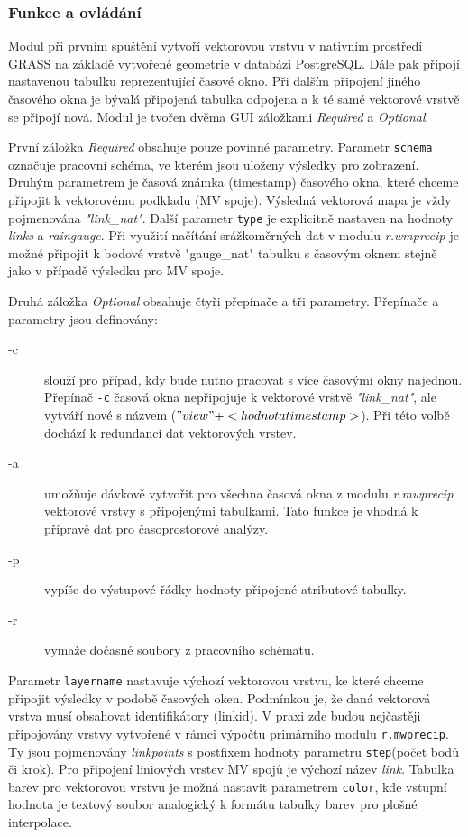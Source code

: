 \documentclass[a4paper,12pt,oneside]{report}
\begin{document}
\subsubsection{Funkce a ovládání}
Modul při prvním spuštění vytvoří vektorovou vrstvu v nativním
prostředí GRASS na základě vytvořené geometrie v databázi
PostgreSQL. Dále pak připojí nastavenou tabulku reprezentující časové
okno. Při dalším připojení jiného časového okna je bývalá připojená
tabulka odpojena a k té samé vektorové vrstvě se připojí nová. Modul
je tvořen dvěma GUI záložkami \textit{Required} a \textit{Optional}.

První záložka \textit{Required} obsahuje pouze povinné parametry.
Parametr \texttt{schema} označuje pracovní schéma, ve kterém jsou
uloženy výsledky pro zobrazení. Druhým parametrem je časová známka
(timestamp) časového okna, které chceme připojit k vektorovému
podkladu (MV spoje). Výsledná vektorová mapa je vždy pojmenována
\textit{"link\_nat"}. Další parametr \texttt{type} je explicitně
nastaven na hodnoty \emph{links} a \emph{raingauge}. Při využití
načítání srážkoměrných dat v modulu \textit{r.wmprecip} je možné
připojit k bodové vrstvě "gauge\_nat" tabulku s časovým oknem stejně
jako v případě výsledku pro MV spoje.

Druhá záložka \textit{Optional} obsahuje čtyři přepínače a tři
parametry.  Přepínače a parametry jsou definovány:
\begin{description}
\item[-c] slouží pro případ, kdy bude nutno pracovat s více časovými
  okny najednou. Přepínač \texttt{-c} časová okna nepřipojuje k
  vektorové vrstvě \textit{"link\_nat"}, ale vytváří nové s názvem
  ($"view" + <hodnota timestamp>$). Při této volbě dochází k
  redundanci dat vektorových vrstev.
\item[-a] umožňuje dávkově vytvořit pro všechna časová okna z modulu
  \textit{r.mwprecip} vektorové vrstvy s připojenými tabulkami. Tato
  funkce je vhodná k přípravě dat pro časoprostorové analýzy.
\item[-p] vypíše do výstupové řádky hodnoty připojené atributové
  tabulky.
\item[-r] vymaže dočasné soubory z pracovního schématu.
\end{description}


Parametr \texttt{layername} nastavuje výchozí vektorovou vrstvu, ke
které chceme připojit výsledky v podobě časových oken. Podmínkou je,
že daná vektorová vrstva musí obsahovat identifikátory (linkid). V
praxi zde budou nejčastěji připojovány vrstvy vytvořené v rámci
výpočtu primárního modulu \texttt{r.mwprecip}. Ty jsou pojmenovány
\textit{linkpoints} s postfixem hodnoty parametru \texttt{step}(počet
bodů či krok). Pro připojení liniových vrstev MV spojů je výchozí
název \textit{link}.  Tabulka barev pro vektorovou vrstvu je možná
nastavit parametrem \texttt{color}, kde vstupní hodnota je textový
soubor analogický k formátu tabulky barev pro plošné interpolace.
\end{document}
